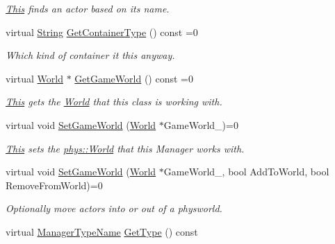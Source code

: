 \begin{DoxyCompactItemize}
\begin{DoxyCompactList}\small\item\em \hyperlink{structThis}{This} finds an actor based on its name. \item\end{DoxyCompactList}\item 
virtual \hyperlink{namespacephys_aa03900411993de7fbfec4789bc1d392e}{String} \hyperlink{classphys_1_1ActorContainerBase_a0ed43bc828aaee8ee33152970c3cc16d}{GetContainerType} () const =0
\begin{DoxyCompactList}\small\item\em Which kind of container it this anyway. \item\end{DoxyCompactList}\item 
virtual \hyperlink{classphys_1_1World}{World} $\ast$ \hyperlink{classphys_1_1ActorContainerBase_a479e6c7434f2611b0cfe6ca1fd4ebdd1}{GetGameWorld} () const =0
\begin{DoxyCompactList}\small\item\em \hyperlink{structThis}{This} gets the \hyperlink{classphys_1_1World}{World} that this class is working with. \item\end{DoxyCompactList}\item 
virtual void \hyperlink{classphys_1_1ActorContainerBase_ae0cb5c288f17507247dd98d3a2466876}{SetGameWorld} (\hyperlink{classphys_1_1World}{World} $\ast$GameWorld\_\-)=0
\begin{DoxyCompactList}\small\item\em \hyperlink{structThis}{This} sets the \hyperlink{classphys_1_1World}{phys::World} that this Manager works with. \item\end{DoxyCompactList}\item 
virtual void \hyperlink{classphys_1_1ActorContainerBase_a366c1797bef08f3a1846bf010e2e2b04}{SetGameWorld} (\hyperlink{classphys_1_1World}{World} $\ast$GameWorld\_\-, bool AddToWorld, bool RemoveFromWorld)=0
\begin{DoxyCompactList}\small\item\em Optionally move actors into or out of a physworld. \item\end{DoxyCompactList}\item 
virtual \hyperlink{classphys_1_1ManagerBase_aaa6ccddf23892eaccb898529414f80a5}{ManagerTypeName} \hyperlink{classphys_1_1ActorContainerBase_aa86380fd1b18d660f68b60f075967cf8}{GetType} () const 

\end{DoxyCompactItemize}
